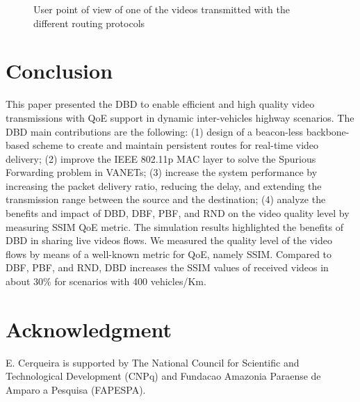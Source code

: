 \documentclass{acm_proc_article-sp}
\begin{document}
\begin{figure}[!t]
\begin{center}
	\caption{User point of view of one of the videos transmitted with the different routing protocols}
	\label{fig:POV}
	\end{center}
\end{figure}




\section{Conclusion}
\label{conclusion}
This paper presented the DBD to enable efficient and high quality video transmissions with QoE support in dynamic inter-vehicles highway scenarios. The DBD main contributions are the following: (1) design of a beacon-less backbone-based scheme to create and maintain persistent routes for real-time video delivery; (2) improve the IEEE 802.11p MAC layer to solve the Spurious Forwarding problem in VANETs; (3) increase the system performance by increasing the packet delivery ratio, reducing the delay, and extending the transmission range between the source and the destination; (4) analyze the benefits and impact of DBD, DBF, PBF, and RND on the video quality level by measuring SSIM QoE metric.
The simulation results highlighted the benefits of DBD in sharing live videos flows. We measured the quality level of the video flows by means of a well-known metric for QoE, namely SSIM. Compared to DBF, PBF, and RND, DBD increases the SSIM values of received videos in about 30\% for scenarios with 400 vehicles/Km.

\section*{Acknowledgment}
E. Cerqueira is supported by The National Council for Scientific and Technological Development (CNPq) and Fundacao Amazonia Paraense de Amparo a Pesquisa (FAPESPA).


%

%
%

\balancecolumns
\end{document}
